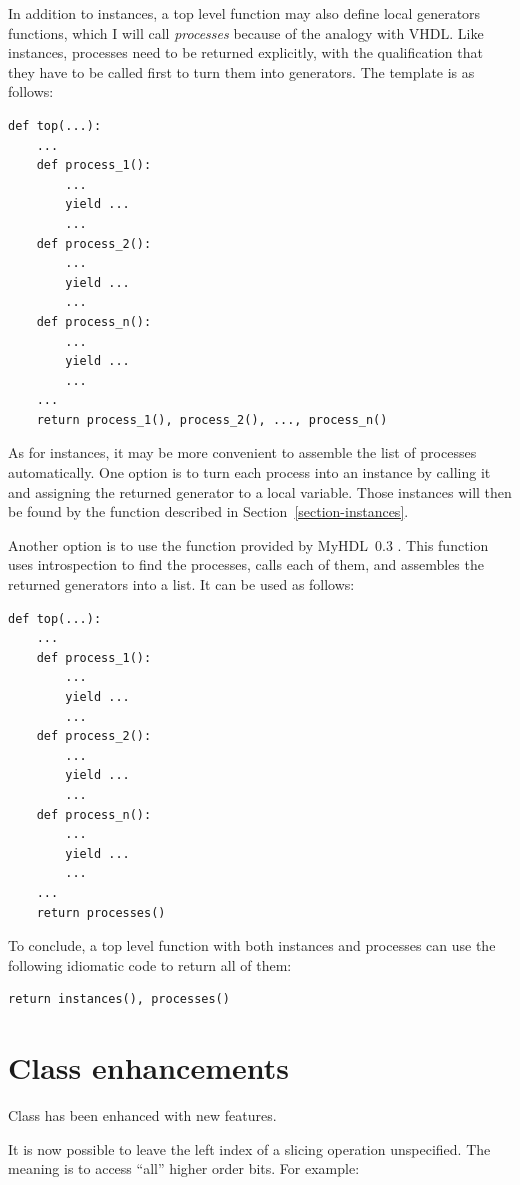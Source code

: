 \documentclass{howto}
\newcommand{\myhdl}{\protect \mbox{MyHDL}}
\begin{document}
In addition to instances, a top level function may
also define local generators functions, which I will
call \emph{processes} because of the analogy with VHDL.
Like instances, processes need to be returned explicitly,
with the qualification that they have to be called first
to turn them into generators. The template is as follows:

\begin{verbatim}
def top(...):
    ...
    def process_1():
        ...
        yield ...
        ...
    def process_2():
        ...
        yield ...
        ...
    def process_n():
        ...
        yield ...
        ...
    ...
    return process_1(), process_2(), ..., process_n()
\end{verbatim}

As for instances, it may be more convenient to assemble the list of
processes automatically. One option is to turn each process into an
instance by calling it and assigning the returned generator to a local
variable. Those instances will then be found by the
 function described in
Section~\ref{section-instances}.

Another option is to use the function  provided
by \myhdl\ 0.3 . This function uses introspection to find the
processes, calls each of them, and assembles the returned generators
into a list. It can be used as follows:

\begin{verbatim}
def top(...):
    ...
    def process_1():
        ...
        yield ...
        ...
    def process_2():
        ...
        yield ...
        ...
    def process_n():
        ...
        yield ...
        ...
    ... 
    return processes()
\end{verbatim}

To conclude, a top level function with both instances and processes
can use the following idiomatic code to return all of them:

\begin{verbatim}
return instances(), processes()
\end{verbatim}

\section{Class  enhancements\label{section-intbv}}

Class  has been enhanced with new features.

It is now possible to leave the left index of a slicing operation
unspecified. The meaning is to access ``all'' higher order bits. For
example:
\end{document}
